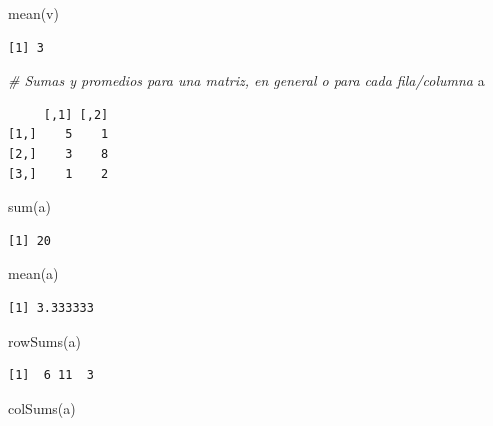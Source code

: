\documentclass[
]{book}
\newenvironment{Shaded}{\begin{snugshade}}{\end{snugshade}}
\newcommand{\CommentTok}[1]{\textcolor[rgb]{0.56,0.35,0.01}{\textit{#1}}}
\newcommand{\FunctionTok}[1]{\textcolor[rgb]{0.00,0.00,0.00}{#1}}
\newcommand{\NormalTok}[1]{#1}
\begin{document}
\begin{Shaded}
\begin{Highlighting}[]
\FunctionTok{mean}\NormalTok{(v)}
\end{Highlighting}
\end{Shaded}

\begin{verbatim}
[1] 3
\end{verbatim}

\begin{Shaded}
\begin{Highlighting}[]
\CommentTok{\# Sumas y promedios para una matriz, en general o para cada fila/columna}
\NormalTok{a}
\end{Highlighting}
\end{Shaded}

\begin{verbatim}
     [,1] [,2]
[1,]    5    1
[2,]    3    8
[3,]    1    2
\end{verbatim}

\begin{Shaded}
\begin{Highlighting}[]
\FunctionTok{sum}\NormalTok{(a)}
\end{Highlighting}
\end{Shaded}

\begin{verbatim}
[1] 20
\end{verbatim}

\begin{Shaded}
\begin{Highlighting}[]
\FunctionTok{mean}\NormalTok{(a)}
\end{Highlighting}
\end{Shaded}

\begin{verbatim}
[1] 3.333333
\end{verbatim}

\begin{Shaded}
\begin{Highlighting}[]
\FunctionTok{rowSums}\NormalTok{(a)}
\end{Highlighting}
\end{Shaded}

\begin{verbatim}
[1]  6 11  3
\end{verbatim}

\begin{Shaded}
\begin{Highlighting}[]
\FunctionTok{colSums}\NormalTok{(a)}
\end{Highlighting}
\end{Shaded}
\end{document}
